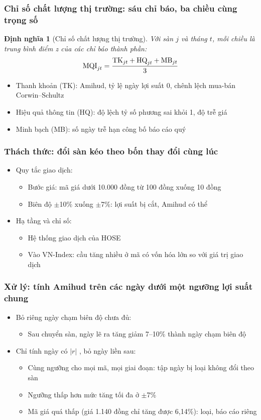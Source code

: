\documentclass[11pt, xcolor={dvipsnames}, aspectratio=169, usepdftitle=false]{beamer}
\newtheorem{dinhnghia}{Định nghĩa} %
\newcommand{\vn}[1]{\text{\normalfont #1}}
\newcommand{\MQI}{\vn{MQI}}
\begin{document}
\begin{frame}
\frametitle{Chỉ số chất lượng thị trường: sáu chỉ báo, ba chiều cùng trọng số}
\begin{dinhnghia}[Chỉ số chất lượng thị trường]
Với sàn $j$ và tháng $t$, mỗi chiều là trung bình điểm z của các chỉ báo thành phần:
\[
\MQI_{jt} = \frac{\vn{TK}_{jt} + \vn{HQ}_{jt} + \vn{MB}_{jt}}{3}
\]
\end{dinhnghia}
\begin{itemize}
\item Thanh khoản (TK): Amihud, tỷ lệ ngày lợi suất 0, chênh lệch mua-bán Corwin--Schultz
\item Hiệu quả thông tin (HQ): độ lệch tỷ số phương sai khỏi 1, độ trễ giá
\item Minh bạch (MB): số ngày trễ hạn công bố báo cáo quý
\end{itemize}
\end{frame}

\begin{frame}
\frametitle{Thách thức: đổi sàn kéo theo bốn thay đổi cùng lúc}
\begin{itemize}
\item Quy tắc giao dịch:
\begin{itemize}
\item Bước giá: mã giá dưới 10.000 đồng từ 100 đồng xuống 10 đồng
\item Biên độ $\pm$10\% xuống $\pm$7\%: lợi suất bị cắt, Amihud có thể 
\end{itemize}
\item Hạ tầng và chỉ số:
\begin{itemize}
\item Hệ thống giao dịch của HOSE
\item Vào VN-Index: cầu tăng nhiều ở mã có vốn hóa lớn so với giá trị giao dịch
\end{itemize}
\end{itemize}
\end{frame}

\begin{frame}
\frametitle{Xử lý: tính Amihud trên các ngày dưới một ngưỡng lợi suất chung}
\begin{itemize}
\item Bỏ riêng ngày chạm biên độ chưa đủ:
\begin{itemize}
\item Sau chuyển sàn, ngày lẽ ra tăng giảm 7--10\% thành ngày chạm biên độ
\end{itemize}
\item Chỉ tính ngày có $|r|$ , bỏ ngày liền sau:
\begin{itemize}
\item Cùng ngưỡng cho mọi mã, mọi giai đoạn: tập ngày bị loại không đổi theo sàn
\item Ngưỡng thấp hơn mức tăng tối đa ở $\pm$7\%
\item Mã giá quá thấp (giá 1.140 đồng chỉ tăng được 6,14\%): loại, báo cáo riêng
\end{itemize}
\end{itemize}
\end{frame}
\end{document}
